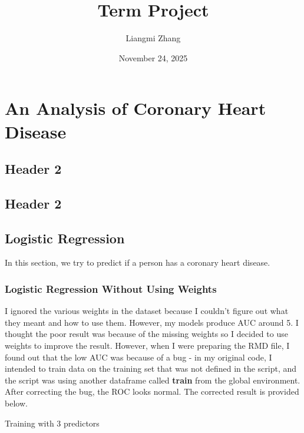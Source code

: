 \documentclass[
]{article}
\title{Term Project}
\author{Liangmi Zhang}
\date{November 24, 2025}
\begin{document}
\maketitle

\section{An Analysis of Coronary Heart
Disease}\label{an-analysis-of-coronary-heart-disease}

\subsection{Header 2}\label{header-2}

\subsection{Header 2}\label{header-2-1}

\subsection{Logistic Regression}\label{logistic-regression}

In this section, we try to predict if a person has a coronary heart
disease.

\subsubsection{Logistic Regression Without Using
Weights}\label{logistic-regression-without-using-weights}

I ignored the various weights in the dataset because I couldn't figure
out what they meant and how to use them. However, my models produce AUC
around 5. I thought the poor result was because of the missing weights
so I decided to use weights to improve the result. However, when I were
preparing the RMD file, I found out that the low AUC was because of a
bug - in my original code, I intended to train data on the training set
that was not defined in the script, and the script was using another
dataframe called \textbf{train} from the global environment. After
correcting the bug, the ROC looks normal. The corrected result is
provided below.

Training with 3 predictors
\end{document}
